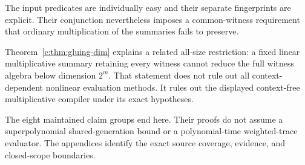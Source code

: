 The input predicates are individually easy and their separate fingerprints are explicit. Their conjunction nevertheless imposes a common-witness requirement that ordinary multiplication of the summaries fails to preserve.

Theorem~\ref{c:thm:gluing-dim} explains a related all-size restriction: a fixed linear multiplicative summary retaining every witness cannot reduce the full witness algebra below dimension $2^m$. That statement does not rule out all context-dependent nonlinear evaluation methods. It rules out the displayed context-free multiplicative compiler under its exact hypotheses.

The eight maintained claim groups end here. Their proofs do not assume a superpolynomial shared-generation bound or a polynomial-time weighted-trace evaluator. The appendices identify the exact source coverage, evidence, and closed-scope boundaries.

